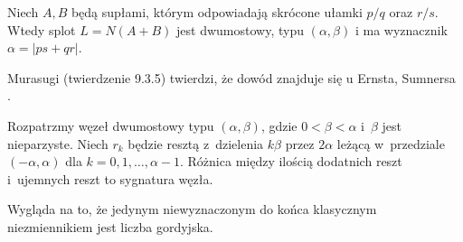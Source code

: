\begin{proposition}

    Niech $A, B$ będą supłami, którym odpowiadają skrócone ułamki $p/q$ oraz $r/s$.
    Wtedy splot $L = N(A+B)$ jest dwumostowy, typu $(\alpha, \beta)$ i ma wyznacznik $\alpha = |ps + qr|$.
\end{proposition}

Murasugi (twierdzenie 9.3.5) twierdzi, że dowód znajduje się u Ernsta, Sumnersa \cite{ernst90}.
%
%

\begin{proposition}
    Rozpatrzmy węzeł dwumostowy typu $(\alpha, \beta)$, gdzie $0 < \beta < \alpha$ i~$\beta$ jest nieparzyste.
    Niech $r_k$ będzie resztą z~dzielenia $k\beta$ przez $2\alpha$ leżącą w~przedziale $(-\alpha, \alpha)$ dla $k = 0, 1, \ldots, \alpha - 1$.
    Różnica między ilością dodatnich reszt i~ujemnych reszt to sygnatura węzła.
\end{proposition}

Wygląda na to, że jedynym niewyznaczonym do końca klasycznym niezmiennikiem jest liczba gordyjska.

%


